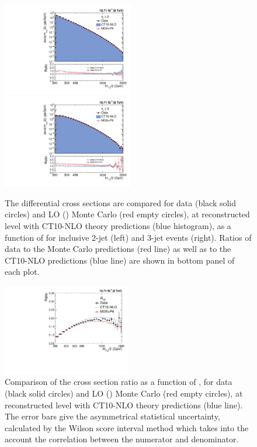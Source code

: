 \begin{figure}[!htbp]
 \begin{center}
 \hspace*{-5mm}\includegraphics[width=0.51\textwidth]{Plots_HT_2_150/Comparison_all_2_HT_2_150.pdf}%
 ~~\includegraphics[width=0.51\textwidth]{Plots_HT_2_150/Comparison_all_3_HT_2_150.pdf}
 \caption{The differential cross sections are compared for data (black solid circles) and LO \MadGraphF \plus \PYTHIAS (\MGP) Monte Carlo (red empty circles), at reconstructed level with CT10-NLO theory predictions (blue histogram), as a function of \httwo for inclusive 2-jet (left) and 3-jet events (right). Ratios of data to the Monte Carlo predictions (red line) as well as to the CT10-NLO predictions (blue line) are shown in bottom panel of each plot.}
 \label{fig:comp_all}
 \end{center}
\end{figure}

\begin{figure}[!h] 
 \begin{center}
 \hspace*{-5mm}\includegraphics[width=0.5\textwidth]{Plots_HT_2_150/Ratio_32_all_HT_2_150.pdf}
 \caption{Comparison of the cross section ratio \ratio as a function of \httwons, for data (black solid circles) and LO \MadGraphF \plus \PYTHIAS (\MGP) Monte Carlo (red empty circles), at reconstructed level with CT10-NLO theory predictions (blue line). The error bars give the asymmetrical statistical uncertainty, calculated by the Wilson score interval method which takes into the account the correlation between the numerator and denominator.}
 \label{fig:ratio_32}
 \end{center}
\end{figure}

